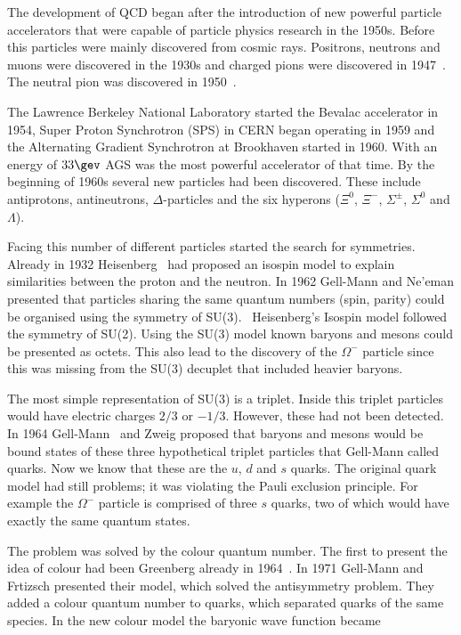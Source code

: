 The development of QCD began after the introduction of new powerful particle accelerators that were capable of particle physics research in the 1950s. Before this particles were mainly discovered from cosmic rays. Positrons, neutrons and muons were discovered in the 1930s and charged pions were discovered in 1947~\cite{Lattes:1947}. The neutral pion was discovered in 1950~\cite{Bjorklund:1950}.

The Lawrence Berkeley National Laboratory started the Bevalac accelerator in 1954, Super Proton Synchrotron (SPS) in CERN began operating in 1959 and the Alternating Gradient Synchrotron at Brookhaven started in 1960. With an energy of $33\gev$ AGS was the most powerful accelerator of that time. By the beginning of 1960s several new particles had been discovered. These include antiprotons, antineutrons, $\Delta$-particles and the six hyperons ($\Xi^0$, $\Xi^-$, $\Sigma^{\pm}$, $\Sigma^0$ and $\Lambda$).

Facing this number of different particles started the search for symmetries. Already in 1932 Heisenberg~\cite{Heisenberg:1932} 
had proposed an isospin model to explain similarities between the proton and the neutron. In 1962 Gell-Mann and Ne'eman presented that particles sharing the same quantum numbers (spin, parity) could be organised using the symmetry of SU(3).~\cite{Gell-Mann:1962} Heisenberg's Isospin model followed the symmetry of SU(2). Using the SU(3) model known baryons and mesons could be presented as octets. This also lead to the discovery of the $\Omega^{-}$ particle since this was missing from the SU(3) decuplet that included heavier baryons. 

The most simple representation of SU(3) is a triplet. Inside this triplet particles would have electric charges $2/3$ or $-1/3$. However, these had not been detected. In 1964 Gell-Mann~\cite{Gell-Mann:1964} and Zweig proposed that baryons and mesons would be bound states of these three hypothetical triplet particles that Gell-Mann called quarks. Now we know that these are the $u$, $d$ and $s$ quarks. The original quark model had still problems; it was violating the Pauli exclusion principle. For example the $\Omega^{-}$ particle is comprised of three $s$ quarks, two of which would have exactly the same quantum states. 

The problem was solved by the colour quantum number. The first to present the idea of colour had been Greenberg already in 1964~\cite{Greenberg:1964}. In 1971 Gell-Mann and Frtizsch presented their model, which solved the antisymmetry problem. They added a colour quantum number to quarks, which separated quarks of the same species. In the new colour model the baryonic wave function became

